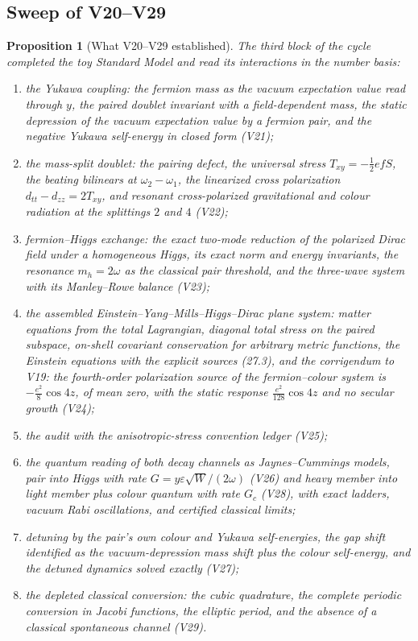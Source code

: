 \documentclass[11pt]{article}
\newtheorem{proposition}[theorem]{Proposition}
\theoremstyle{remark}
\begin{document}
\subsection{Sweep of V20--V29}

\begin{proposition}[What V20--V29 established]
\label{prop:v20v30-sweep}
The third block of the cycle completed the toy Standard Model and
read its interactions in the number basis:

\begin{enumerate}
\item the Yukawa coupling: the fermion mass as the vacuum expectation
value read through \(y\), the paired doublet invariant with a
field-dependent mass, the static depression of the vacuum expectation
value by a fermion pair, and the negative Yukawa self-energy in closed
form (V21);
\item the mass-split doublet: the pairing defect, the universal stress
\(T_{xy}=-\tfrac12efS\), the beating bilinears at \(\omega_2-\omega_1\),
the linearized cross polarization \(d_{tt}-d_{zz}=2T_{xy}\), and
resonant cross-polarized gravitational and colour radiation at the
splittings \(2\) and \(4\) (V22);
\item fermion--Higgs exchange: the exact two-mode reduction of the
polarized Dirac field under a homogeneous Higgs, its exact norm and
energy invariants, the resonance \(m_h=2\omega\) as the classical pair
threshold, and the three-wave system with its Manley--Rowe balance
(V23);
\item the assembled Einstein--Yang--Mills--Higgs--Dirac plane system:
matter equations from the total Lagrangian, diagonal total stress on
the paired subspace, on-shell covariant conservation for arbitrary
metric functions, the Einstein equations with the explicit sources
(27.3), and the corrigendum to V19: the fourth-order polarization
source of the fermion--colour system is \(-\tfrac{e^2}8\cos4z\), of
mean zero, with the static response \(\tfrac{e^2}{128}\cos4z\) and no
secular growth (V24);
\item the audit with the anisotropic-stress convention ledger (V25);
\item the quantum reading of both decay channels as Jaynes--Cummings
models, pair into Higgs with rate \(G=y\varepsilon\sqrt W/(2\omega)\)
(V26) and heavy member into light member plus colour quantum with rate
\(G_c\) (V28), with exact ladders, vacuum Rabi oscillations, and
certified classical limits;
\item detuning by the pair's own colour and Yukawa self-energies, the
gap shift identified as the vacuum-depression mass shift plus the
colour self-energy, and the detuned dynamics solved exactly (V27);
\item the depleted classical conversion: the cubic quadrature, the
complete periodic conversion in Jacobi functions, the elliptic
period, and the absence of a classical spontaneous channel (V29).
\end{enumerate}
\end{proposition}
\end{document}
